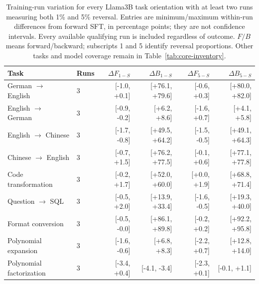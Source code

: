 \begin{table}[t]\centering\small
\begin{tabular}{llrrrr}\toprule
Task & Runs & $\Delta F_{1-S}$ & $\Delta B_{1-S}$ & $\Delta F_{5-S}$ & $\Delta B_{5-S}$ \\\midrule
German $\to$ English & 3 & [-1.0, +0.1] & [+76.1, +79.6] & [-0.6, +0.3] & [+80.0, +82.0] \\
English $\to$ German & 3 & [-0.9, -0.2] & [+6.2, +8.6] & [-1.6, +0.7] & [+4.1, +5.8] \\
English $\to$ Chinese & 3 & [-1.7, -0.8] & [+49.5, +64.2] & [-1.5, -0.5] & [+49.1, +64.3] \\
Chinese $\to$ English & 3 & [-0.7, +1.5] & [+76.2, +77.5] & [-0.1, +0.6] & [+77.1, +77.8] \\
Code transformation & 3 & [-0.2, +1.7] & [+52.0, +60.0] & [+0.0, +1.9] & [+68.8, +71.4] \\
Question $\to$ SQL & 3 & [-0.5, +2.0] & [+13.9, +33.4] & [-1.6, -0.5] & [+19.3, +40.0] \\
Format conversion & 3 & [-0.5, -0.0] & [+86.1, +89.8] & [-0.2, +0.2] & [+92.2, +95.8] \\
Polynomial expansion & 3 & [-1.6, -0.6] & [+6.8, +8.3] & [-2.2, +0.7] & [+12.8, +14.0] \\
Polynomial factorization & 3 & [-3.4, +0.4] & [-4.1, -3.4] & [-2.3, +0.1] & [-0.1, +1.1] \\
\bottomrule\end{tabular}
\caption{Training-run variation for every Llama3B task orientation with at least two runs measuring both 1\% and 5\% reversal. Entries are minimum/maximum within-run differences from forward SFT, in percentage points; they are not confidence intervals. Every available qualifying run is included regardless of outcome. $F/B$ means forward/backward; subscripts 1 and 5 identify reversal proportions. Other tasks and model coverage remain in Table~\ref{tab:core-inventory}.}\label{tab:main-seed-variation}\end{table}
